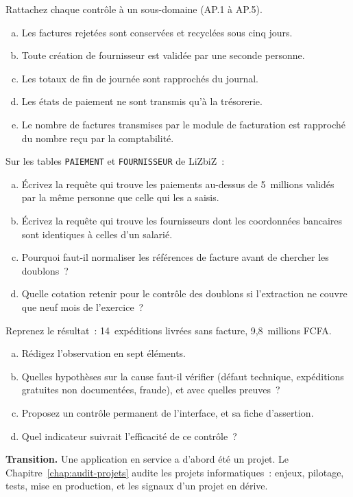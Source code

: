\begin{boxexo}[title={\ding{45}\quad Exercice~14.1. Rattacher les contrôles \niveaubase}]
Rattachez chaque contrôle à un sous-domaine (AP.1 à AP.5).
\begin{enumerate}[(a)]
    \item Les factures rejetées sont conservées et recyclées sous cinq jours.
    \item Toute création de fournisseur est validée par une seconde personne.
    \item Les totaux de fin de journée sont rapprochés du journal.
    \item Les états de paiement ne sont transmis qu'à la trésorerie.
    \item Le nombre de factures transmises par le module de facturation est
          rapproché du nombre reçu par la comptabilité.
\end{enumerate}
\end{boxexo}

\begin{boxexo}[title={\ding{45}\quad Exercice~14.2. Écrire les requêtes \niveaumoyen}]
Sur les tables \texttt{PAIEMENT} et \texttt{FOURNISSEUR} de LiZbiZ~:
\begin{enumerate}[(a)]
    \item Écrivez la requête qui trouve les paiements au-dessus de
          5~millions validés par la même personne que celle qui les a
          saisis.
    \item Écrivez la requête qui trouve les fournisseurs dont les
          coordonnées bancaires sont identiques à celles d'un salarié.
    \item Pourquoi faut-il normaliser les références de facture avant de
          chercher les doublons~?
    \item Quelle cotation retenir pour le contrôle des doublons si
          l'extraction ne couvre que neuf mois de l'exercice~?
\end{enumerate}
\end{boxexo}

\begin{boxexo}[title={\ding{45}\quad Exercice~14.3. L'interface expéditions-facturation \niveauexpert}]
Reprenez le résultat~: 14~expéditions livrées sans facture, 9,8~millions
FCFA.
\begin{enumerate}[(a)]
    \item Rédigez l'observation en sept éléments.
    \item Quelles hypothèses sur la cause faut-il vérifier (défaut technique,
          expéditions gratuites non documentées, fraude), et avec quelles
          preuves~?
    \item Proposez un contrôle permanent de l'interface, et sa fiche
          d'assertion.
    \item Quel indicateur suivrait l'efficacité de ce contrôle~?
\end{enumerate}
\end{boxexo}

\bigskip

\begin{boxinfo}
\textbf{Transition.} Une application en service a d'abord été un projet.
Le Chapitre~\ref{chap:audit-projets} audite les projets informatiques~:
enjeux, pilotage, tests, mise en production, et les signaux d'un projet en
dérive.
\end{boxinfo}
